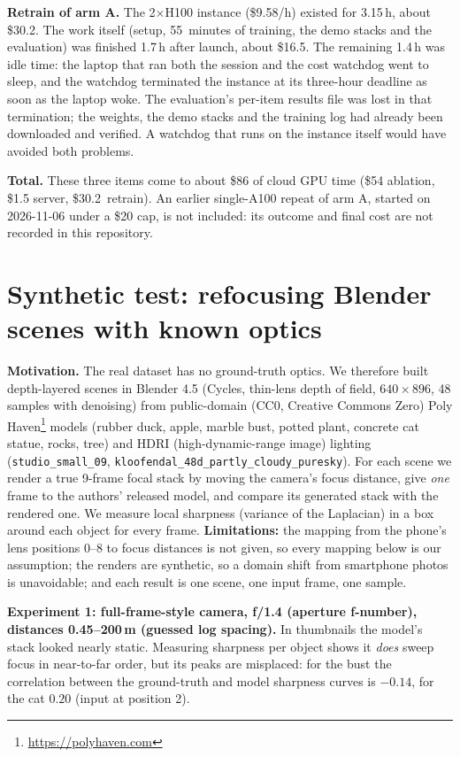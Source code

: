 \documentclass[11pt]{article}
\newcommand{\RetrainTrainMin}{55}  %
\newcommand{\RetrainHours}{3.15}     %
\newcommand{\RetrainCost}{30.2}      %
\begin{document}
\textbf{Retrain of arm A.} The 2$\times$H100 instance (\$9.58/h) existed for \RetrainHours\,h, about \$\RetrainCost. The work itself (setup, \RetrainTrainMin\ minutes of training, the demo stacks and the evaluation) was finished 1.7\,h after launch, about \$16.5. The remaining 1.4\,h was idle time: the laptop that ran both the session and the cost watchdog went to sleep, and the watchdog terminated the instance at its three-hour deadline as soon as the laptop woke. The evaluation's per-item results file was lost in that termination; the weights, the demo stacks and the training log had already been downloaded and verified. A watchdog that runs on the instance itself would have avoided both problems.

\textbf{Total.} These three items come to about \$86 of cloud GPU time (\$54 ablation, \$1.5 server, \$\RetrainCost\ retrain). An earlier single-A100 repeat of arm A, started on 2026-11-06 under a \$20 cap, is not included: its outcome and final cost are not recorded in this repository.

\section{Synthetic test: refocusing Blender scenes with known optics}\label{sec:blender}
\textbf{Motivation.} The real dataset has no ground-truth optics. We therefore built depth-layered scenes in Blender 4.5 (Cycles, thin-lens depth of field, $640\times896$, 48 samples with denoising) from public-domain (CC0, Creative Commons Zero) Poly Haven\footnote{\url{https://polyhaven.com}} models (rubber duck, apple, marble bust, potted plant, concrete cat statue, rocks, tree) and HDRI (high-dynamic-range image) lighting (\texttt{studio\_small\_09}, \texttt{kloofendal\_48d\_partly\_cloudy\_puresky}). For each scene we render a true 9-frame focal stack by moving the camera's focus distance, give \emph{one} frame to the authors' released model, and compare its generated stack with the rendered one. We measure local sharpness (variance of the Laplacian) in a box around each object for every frame.
\textbf{Limitations:} the mapping from the phone's lens positions 0--8 to focus distances is not given, so every mapping below is our assumption; the renders are synthetic, so a domain shift from smartphone photos is unavoidable; and each result is one scene, one input frame, one sample.

\textbf{Experiment 1: full-frame-style camera, f/1.4 (aperture f-number),  distances 0.45--200\,m (guessed log spacing).} In thumbnails the model's stack looked nearly static. Measuring sharpness per object shows it \emph{does} sweep focus in near-to-far order, but its peaks are misplaced: for the bust the correlation between the ground-truth and model sharpness curves is $-0.14$, for the cat $0.20$ (input at position 2).
\end{document}
